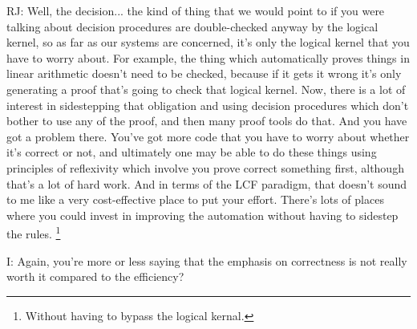 \documentclass[10pt,titlepage]{book}
\begin{document}
RJ: Well, the decision... the kind of thing that we would point to if you were talking about decision procedures are double-checked anyway by the logical kernel, so as far as our systems are concerned, it's only the logical kernel that you have to worry about.
For example, the thing which automatically proves things in linear arithmetic doesn't need to be checked, because if it gets it wrong it's only generating a proof that's going to check that logical kernel.
Now, there is a lot of interest in sidestepping that obligation and using decision procedures which don't bother to use any of the proof, and then many proof tools do that.
And you have got a problem there.
You've got more code that you have to worry about whether it's correct or not, and ultimately one may be able to do these things using principles of reflexivity which involve you prove correct something first, although that's a lot of hard work.
And in terms of the LCF paradigm, that doesn't sound to me like a very cost-effective place to put your effort.
There's lots of places where you could invest in improving the automation without having to sidestep the 	rules.%
\footnote{
Without having to bypass the logical kernal.}

I: Again, you're more or less saying that the emphasis on correctness is not really worth it compared to the efficiency?
\end{document}
